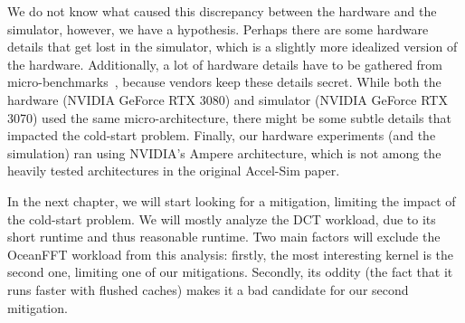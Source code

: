 We do not know what caused this discrepancy between the hardware and the simulator, however, we have a hypothesis.
Perhaps there are some hardware details that get lost in the simulator, which is a slightly more idealized version of the hardware.
Additionally, a lot of hardware details have to be gathered from micro-benchmarks~\cite{accelsim}, because vendors keep these details secret.
While both the hardware (NVIDIA GeForce RTX 3080) and simulator (NVIDIA GeForce RTX 3070) used the same micro-architecture, there might be some subtle details that impacted the cold-start problem.
Finally, our hardware experiments (and the simulation) ran using NVIDIA's Ampere architecture, which is not among the heavily tested architectures in the original Accel-Sim paper.

In the next chapter, we will start looking for a mitigation, limiting the impact of the cold-start problem.
We will mostly analyze the DCT workload, due to its short runtime and thus reasonable runtime.
Two main factors will exclude the OceanFFT workload from this analysis: firstly, the most interesting kernel is the second one, limiting one of our mitigations.
Secondly, its oddity (the fact that it runs faster with flushed caches) makes it a bad candidate for our second mitigation.